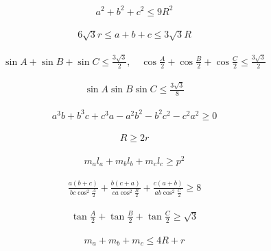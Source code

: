 \begin{theorem}
  \begin{align}
    a^2 + b^2 + c^2 \le 9R^2
  \end{align}
\end{theorem}

\begin{theorem}
  \begin{align}
    6\sqrt3 r \le a + b + c \le 3\sqrt3 R
  \end{align}
\end{theorem}

\begin{theorem}
  \begin{align}
    \sin A + \sin B + \sin C \le \frac{3\sqrt3}{2},\quad
    \cos\frac A2 + \cos\frac B2 + \cos\frac C2 \le \frac{3\sqrt3}{2}
  \end{align}
\end{theorem}

\begin{theorem}
  \begin{align}
    \sin A \sin B \sin C\le \frac{3\sqrt3}{8}
  \end{align}
\end{theorem}

\begin{theorem}
  \begin{align}
    a^3b + b^3c + c^3a - a^2b^2 - b^2c^2 - c^2a^2 \ge 0
  \end{align}
\end{theorem}

\begin{theorem}
  \begin{align}
    R\ge 2r
  \end{align}
\end{theorem}

\begin{theorem}
  \begin{align}
    m_al_a + m_bl_b + m_cl_c \ge p^2
  \end{align}
\end{theorem}

\begin{theorem}
  \begin{align}
    \frac{a(b+c)}{bc\cos^2\frac A2} + \frac{b(c+a)}{ca\cos^2\frac B2} +
    \frac{c(a+b)}{ab\cos^2\frac C2} \ge 8
  \end{align}
\end{theorem}

\begin{theorem}
  \begin{align}
    \tan\frac A2 + \tan\frac B2 + \tan\frac C2 \ge \sqrt3
  \end{align}
\end{theorem}

\begin{theorem}
  \begin{align}
    m_a + m_b + m_c \le 4R + r
  \end{align}
\end{theorem}





